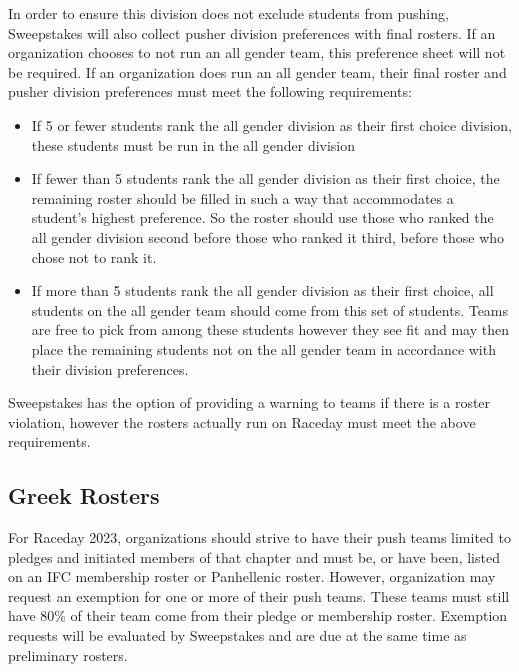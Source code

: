 In order to ensure this division does not exclude students from pushing, Sweepstakes will also collect pusher division preferences with final rosters. If an organization chooses to not run an all gender team, this preference sheet will not be required. If an organization does run an all gender team, their final roster and pusher division preferences must meet the following requirements: 
\begin{itemize}
    \item If 5 or fewer students rank the all gender division as their first choice division, these students must be run in the all gender division 
    \item If fewer than 5 students rank the all gender division as their first choice, the remaining roster should be filled in such a way that accommodates a student's highest preference. So the roster should use those who ranked the all gender division second before those who ranked it third, before those who chose not to rank it. 
    \item If more than 5 students rank the all gender division as their first choice, all students on the all gender team should come from this set of students. Teams are free to pick from among these students however they see fit and may then place the remaining students not on the all gender team in accordance with their division preferences. 
\end{itemize}


Sweepstakes has the option of providing a warning to teams if there is a roster violation, however the rosters actually run on Raceday must meet the above requirements. 

\subsection*{Greek Rosters} \label{Greek}
For Raceday 2023, organizations should strive to have their push teams limited to pledges and initiated members of that chapter and must be, or have been, listed on an IFC membership roster or Panhellenic roster. However, organization may request an exemption for one or more of their push teams. These teams must still have 80\% of their team come from their pledge or membership roster. Exemption requests will be evaluated by Sweepstakes and are due at the same time as preliminary rosters. 

